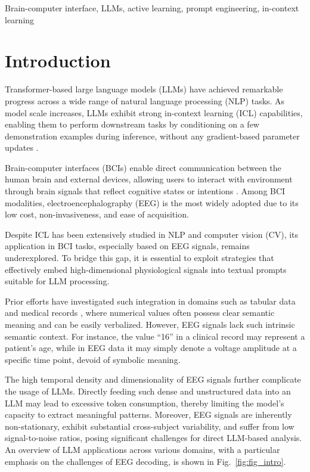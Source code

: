 \documentclass[journal,twocolumn]{IEEEtran}
\begin{document}
\begin{IEEEkeywords}
Brain-computer interface, LLMs, active learning, prompt engineering, in-context learning
\end{IEEEkeywords}

\IEEEpeerreviewmaketitle

\section{Introduction}

Transformer-based large language models (LLMs) \cite{vaswani2017attention} have achieved remarkable progress across a wide range of natural language processing (NLP) tasks. As model scale increases, LLMs exhibit strong in-context learning (ICL) capabilities, enabling them to perform downstream tasks by conditioning on a few demonstration examples during inference, without any gradient-based parameter updates \cite{brown2020language}.

Brain-computer interfaces (BCIs) \cite{Lance2012, Wolpaw2002} enable direct communication between the human brain and external devices, allowing users to interact with environment through brain signals that reflect cognitive states or intentions \cite{he2019transfer}. Among BCI modalities, electroencephalography (EEG) is the most widely adopted due to its low cost, non-invasiveness, and ease of acquisition.

Despite ICL has been extensively studied in NLP and computer vision (CV), its application in BCI tasks, especially based on EEG signals, remains underexplored. To bridge this gap, it is essential to exploit strategies that effectively embed high-dimensional physiological signals into textual prompts suitable for LLM processing.

Prior efforts have investigated such integration in domains such as tabular data \cite{hegselmann2023tabllm, liu2025umman} and medical records \cite{liu2023large}, where numerical values often possess clear semantic meaning and can be easily verbalized. However, EEG signals lack such intrinsic semantic context. For instance, the value “16” in a clinical record may represent a patient’s age, while in EEG data it may simply denote a voltage amplitude at a specific time point, devoid of symbolic meaning.

The high temporal density and dimensionality of EEG signals further complicate the usage of LLMs. Directly feeding such dense and unstructured data into an LLM may lead to excessive token consumption, thereby limiting the model’s capacity to extract meaningful patterns. Moreover, EEG signals are inherently non-stationary, exhibit substantial cross-subject variability, and suffer from low signal-to-noise ratios, posing significant challenges for direct LLM-based analysis. An overview of LLM applications across various domains, with a particular emphasis on the challenges of EEG decoding, is shown in Fig.~\ref{fig:fig_intro}.
\end{document}
